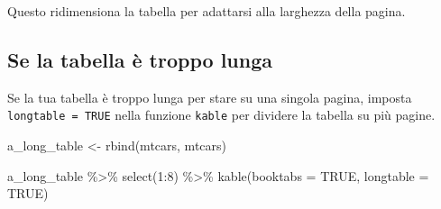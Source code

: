 \documentclass[a4paper, 11pt, nobind]{templates/ociamthesis}
\newenvironment{Shaded}{\begin{snugshade}}{\end{snugshade}}
\newcommand{\AttributeTok}[1]{\textcolor[rgb]{0.77,0.63,0.00}{#1}}
\newcommand{\ConstantTok}[1]{\textcolor[rgb]{0.00,0.00,0.00}{#1}}
\newcommand{\DecValTok}[1]{\textcolor[rgb]{0.00,0.00,0.81}{#1}}
\newcommand{\FunctionTok}[1]{\textcolor[rgb]{0.00,0.00,0.00}{#1}}
\newcommand{\NormalTok}[1]{#1}
\newcommand{\OtherTok}[1]{\textcolor[rgb]{0.56,0.35,0.01}{#1}}
\newcommand{\SpecialCharTok}[1]{\textcolor[rgb]{0.00,0.00,0.00}{#1}}
\renewenvironment{Shaded}
{
  \vspace{10pt}%
  \begin{snugshade}%
}{%
  \end{snugshade}%
  \vspace{8pt}%
}
\begin{document}
\begin{table}
\centering
{}
\end{table}

Questo ridimensiona la tabella per adattarsi alla larghezza della pagina.

\hypertarget{se-la-tabella-uxe8-troppo-lunga}{%
\subsection{Se la tabella è troppo lunga}\label{se-la-tabella-uxe8-troppo-lunga}}

Se la tua tabella è troppo lunga per stare su una singola pagina, imposta \texttt{longtable\ =\ TRUE} nella funzione \texttt{kable} per dividere la tabella su più pagine.

\begin{Shaded}
\begin{Highlighting}[]
\NormalTok{a\_long\_table }\OtherTok{\textless{}{-}} \FunctionTok{rbind}\NormalTok{(mtcars, mtcars)}

\NormalTok{a\_long\_table }\SpecialCharTok{\%\textgreater{}\%} 
  \FunctionTok{select}\NormalTok{(}\DecValTok{1}\SpecialCharTok{:}\DecValTok{8}\NormalTok{) }\SpecialCharTok{\%\textgreater{}\%} 
  \FunctionTok{kable}\NormalTok{(}\AttributeTok{booktabs =} \ConstantTok{TRUE}\NormalTok{, }\AttributeTok{longtable =} \ConstantTok{TRUE}\NormalTok{)}
\end{Highlighting}
\end{Shaded}
\end{document}
